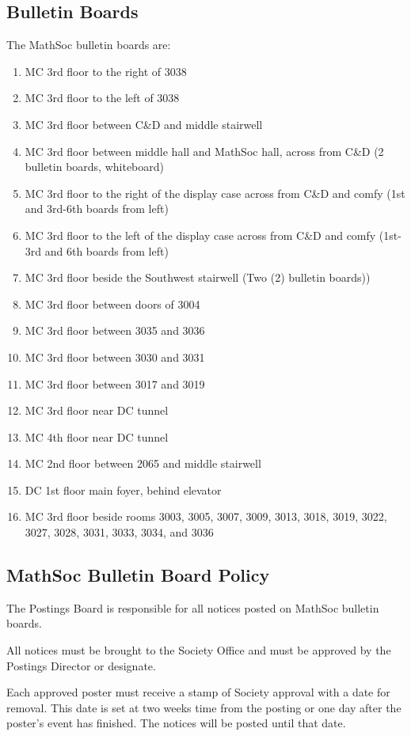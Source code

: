 \subsection{Bulletin Boards}
The MathSoc bulletin boards are:
\begin{enumerate}
\item MC 3rd floor to the right of 3038
\item MC 3rd floor to the left of 3038
\item MC 3rd floor between C\&D and middle stairwell
\item MC 3rd floor between middle hall and MathSoc hall, across from C\&D (2 bulletin boards, whiteboard)
\item MC 3rd floor to the right of the display case across from C\&D and comfy (1st and 3rd-6th boards from left)
\item MC 3rd floor to the left of the display case across from C\&D and comfy (1st-3rd and 6th boards from left)
\item MC 3rd floor beside the Southwest stairwell (Two (2) bulletin boards))
\item MC 3rd floor between doors of 3004
\item MC 3rd floor between 3035 and 3036
\item MC 3rd floor between 3030 and 3031
\item MC 3rd floor between 3017 and 3019
\item MC 3rd floor near DC tunnel
\item MC 4th floor near DC tunnel
\item MC 2nd floor between 2065 and middle stairwell
\item DC 1st floor main foyer, behind elevator
\item MC 3rd floor beside rooms 3003, 3005, 3007, 3009, 3013, 3018, 3019, 3022, 3027, 3028, 3031, 3033, 3034, and 3036
\end{enumerate}

\subsection{MathSoc Bulletin Board Policy}
The Postings Board is responsible for all notices posted on MathSoc bulletin boards.

All notices must be brought to the Society Office and must be approved by the Postings Director or designate.

Each approved poster must receive a stamp of Society approval with a date for removal. This date is set at two weeks time from the posting or one day after the poster's event has finished. The notices will be posted until that date.

